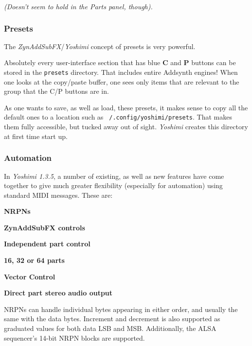    \textsl{(Doesn't seem to hold in the Parts panel, though).}

\subsubsection{Presets}
\label{subsubsec:stock_settings_elements_presets}

   The \textsl{ZynAddSubFX}/\textsl{Yoshimi} concept of presets is very
   powerful.

   Absolutely every user-interface section that has blue \textbf{C}
   and \textbf{P} buttons can be
   stored in the \texttt{presets} directory. That includes entire Addsynth
   engines! When one looks at the copy/paste buffer, one sees only items that
   are relevant to the group that the C/P buttons are in.

   As one wants to save, as well as load, these presets, it makes sense to copy
   all the default ones to a location such as
   \texttt{~/.config/yoshimi/presets}. That makes them fully accessible, but
   tucked away out of sight.  \textsl{Yoshimi} creates this directory at first
   time start up.

\subsubsection{Automation}
\label{subsubsec:stock_settings_elements_automation}

   In \textsl{Yoshimi 1.3.5}, a number of existing, as well as new features
   have come together to give much greater flexibility (especially for
   automation) using standard MIDI messages. These are:

   \begin{enumber}
      \item \textbf{NRPNs}
      \item \textbf{ZynAddSubFX controls}
      \item \textbf{Independent part control}
      \item \textbf{16, 32 or 64 parts}
      \item \textbf{Vector Control}
      \item \textbf{Direct part stereo audio output}
   \end{enumber}

   \setcounter{ItemCounter}{0}      %

   NRPNs can handle individual bytes appearing in either order, and usually the
   same with the data bytes. Increment and decrement is also supported as
   graduated values for both data LSB and MSB. Additionally, the ALSA
   sequencer's 14-bit NRPN blocks are supported.

